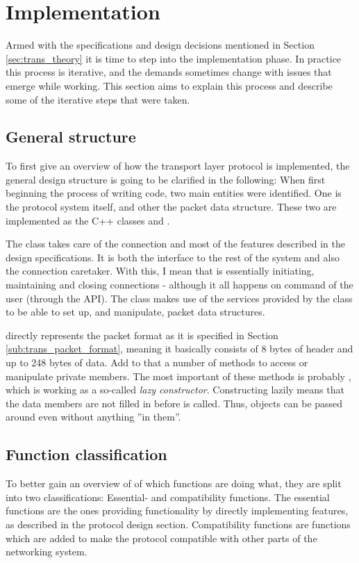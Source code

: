 \section{Implementation}\label{sec:trans_implementation}
Armed with the specifications and design decisions mentioned in Section \ref{sec:trans_theory} it is time to step into the implementation phase. In practice this process is iterative, and the demands sometimes change with issues that emerge while working. This section aims to explain this process and describe some of the iterative steps that were taken.


\subsection{General structure}
To first give an overview of how the transport layer protocol is implemented, the general design structure is going to be clarified in the following: When first beginning the process of writing code, two main entities were identified. One is the protocol system itself, and other the packet data structure. These two are implemented as the C++ classes  and .

The  class takes care of the connection and most of the features described in the design specifications. It is both the interface to the rest of the system and also the connection caretaker. With this, I mean that  is essentially initiating, maintaining and closing connections - although it all happens on command of the user (through the API). The  class makes use of the services provided by the  class to be able to set up, and manipulate, packet data structures.

 directly represents the packet format as it is specified in Section \ref{sub:trans_packet_format}, meaning it basically consists of 8 bytes of header and up to 248 bytes of data. Add to that a number of methods to access or manipulate private members. The most important of these methods is probably , which is working as a so-called \textit{lazy constructor}. Constructing lazily means that the  data members are not filled in before  is called. Thus,  objects can be passed around even without anything ''in them''.


\subsection{Function classification}
To better gain an overview of of which functions are doing what, they are split into two classifications: Essential- and compatibility functions. The essential functions are the ones providing functionality by directly implementing features, as described in the protocol design section. Compatibility functions are functions which are added to make the protocol compatible with other parts of the networking system.

